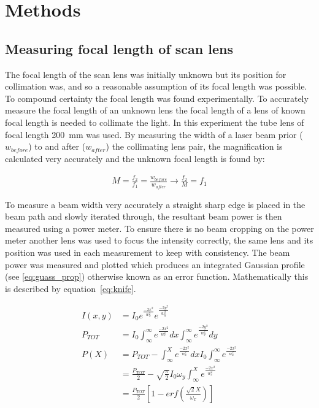 
\ifpdf
    \graphicspath{{Appendix1/Figs/Raster/}{Appendix1/Figs/PDF/}{Appendix1/Figs/}}
\else
    \graphicspath{{Appendix1/Figs/Vector/}{Appendix1/Figs/}}
\fi

\chapter{Methods}
\section{Measuring focal length of scan lens}\label{appendix:scanlens}

The focal length of the scan lens was initially unknown but its position for collimation was, and so a reasonable assumption of its focal length was possible.
To compound certainty the focal length was found experimentally.
To accurately measure the focal length of an unknown lens the focal length of a lens of known focal length is needed to collimate the light.
In this experiment the tube lens of focal length \SI{200}{\milli\meter} was used.
By measuring the width of a laser beam prior ($w_{before}$) to and after ($w_{after}$) the collimating lens pair, the magnification is calculated very accurately and the unknown focal length is found by:

\begin{align}
	M=\frac{f_2}{f_1}=\frac{w_{before}}{w_{after}}  \rightarrow \frac{f_2}{M} =f_{1}
\end{align}

To measure a beam width very accurately a straight sharp edge is placed in the beam path and slowly iterated through, the resultant beam power is then measured using a power meter.
To ensure there is no beam cropping on the power meter another lens was used to focus the intensity correctly, the same lens and its position was used in each measurement to keep with consistency.
The beam power was measured and plotted which produces an integrated Gaussian profile (see \eqref{eq:guass_prop}) otherwise known as an error function.
Mathematically this is described by equation~\eqref{eq:knife}.

\begin{align}
	I(x,y) &= I_0 e^{\frac{-2x^2}{w_x^2}}e^{\frac{-2y^2}{w_y^2}}\label{eq:guass_prop}\\\nonumber
	P_{TOT} &= I_0 \int_{\infty}^{\infty}e^{\frac{-2x^2}{w_x^2}} dx \int_{\infty}^{\infty}e^{\frac{-2y^2}{w_y^2}} dy\\\nonumber
	P(X) &= P_{TOT} - \int_{\infty}^{X}e^{\frac{-2x^2}{w_x^2}} dx I_0 \int_{\infty}^{\infty}e^{\frac{-2x^2}{w_x^2}} \\\nonumber
	&= \frac{P_{TOT}}{2} - \sqrt{\frac{\pi}{2}} I_0 \omega_y \int_{\infty}^{X}e^{\frac{-2x^2}{w_x^2}}\\
	& = \frac{P_{TOT}}{2} \left[1 - erf\left(\frac{\sqrt{2}X}{\omega_x}\right) \right] \label{eq:knife}
\end{align}


